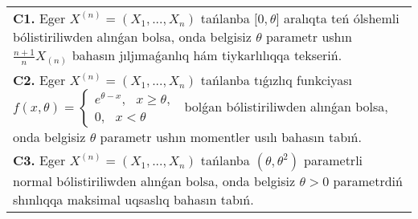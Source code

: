 \documentclass{article}
\begin{document}
\begin{tabular}{m{17cm}}
\textbf{C1.} 
Eger \(X^{(n)} = \left( X_{1},...,X_{n} \right)\) tańlanba \(\lbrack 0,\theta\rbrack\) aralıqta teń ólshemli bólistiriliwden alınǵan bolsa, onda belgisiz \(\theta\) parametr ushın \(\frac{n + 1}{n}X_{(n)}\) bahasın jıljımaǵanlıq hám tiykarlılıqqa tekseriń.
 \\
\textbf{C2.} 
Eger \(X^{(n)} = \left( X_{1},...,X_{n} \right)\) tańlanba tıǵızlıq funkciyası
$
{f(x,\theta) = \left\{ \begin{array}{r}
e^{\theta - x},\ \ \ x \geq \theta, \\
0,\ \ \ x < \theta
\end{array} \right.\ }$
bolǵan bólistiriliwden alınǵan bolsa, onda belgisiz \(\theta\) parametr ushın momentler usılı bahasın tabıń.
 \\
\textbf{C3.} 
Eger \(X^{(n)} = \left( X_{1},...,X_{n} \right)\) tańlanba \(\left( \theta,\theta^{2} \right)\) parametrli normal bólistiriliwden alınǵan bolsa, onda belgisiz \(\theta > 0\) parametrdiń shınlıqqa maksimal uqsaslıq bahasın tabıń.
 \\

\end{tabular}
\vspace{1cm}
\end{document}
